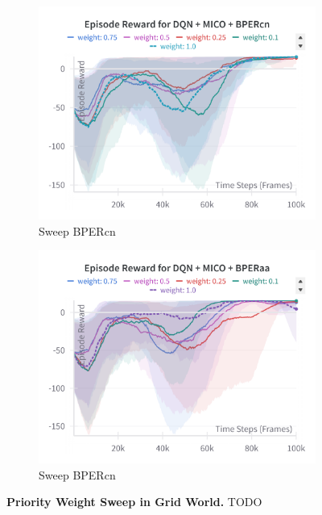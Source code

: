 \begin{figure}[H]
    \centering
    \begin{subfigure}{0.45\textwidth}
    \includegraphics[width=\linewidth]{Results/grid_world/sweep_bpercn_grid_world.png}
        \caption{Sweep BPERcn}
        \label{fig:sweep_bpercn_grid_world}
    \end{subfigure}
    \hfill
    \begin{subfigure}{0.45\textwidth}
        \includegraphics[width=\linewidth]{Results/grid_world/sweep_bperaa_grid_world.png}
        \caption{Sweep BPERcn}
        \label{fig:sweep_bperaa_grid_world}
    \end{subfigure}
    \caption[Priority Weight Sweep in Grid World]{\textbf{Priority Weight Sweep in Grid World.} TODO}
    \label{fig:sweep_methods_grid_world}
\end{figure}

